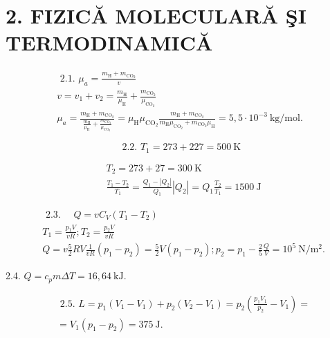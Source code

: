 \documentclass[10pt]{article}
\begin{document}
\section*{2. FIZICĂ MOLECULARĂ ŞI TERMODINAMICĂ}
$$
\begin{gathered}
\text { 2.1. } \mu_{a}=\frac{m_{\mathrm{H}}+m_{\mathrm{CO}_{2}}}{v} \\
v=v_{1}+v_{2}=\frac{m_{\mathrm{H}}}{\mu_{\mathrm{H}}}+\frac{m_{\mathrm{CO}_{2}}}{\mu_{\mathrm{CO}_{2}}} \\
\mu_{a}=\frac{m_{\mathrm{H}}+m_{\mathrm{CO}_{2}}}{\frac{m_{\mathrm{H}}}{\mu_{\mathrm{H}}}+\frac{m_{\mathrm{CO}_{2}}}{\mu_{\mathrm{CO}_{2}}}}=\mu_{\mathrm{H}} \mu_{\mathrm{CO}_{2}} \frac{m_{\mathrm{H}}+m_{\mathrm{CO}_{2}}}{m_{\mathrm{H}} \mu_{\mathrm{CO}_{2}}+m_{\mathrm{CO}_{2}} \mu_{\mathrm{H}}}=5,5 \cdot 10^{-3} \mathrm{~kg} / \mathrm{mol} .
\end{gathered}
$$

$$
\text { 2.2. } T_{1}=273+227=500 \mathrm{~K}
$$

$$
\begin{aligned}
& T_{2}=273+27=300 \mathrm{~K} \\
& \frac{T_{1}-T_{2}}{T_{1}}=\frac{Q_{1}-\left|Q_{2}\right|}{Q_{1}}\left|Q_{2}\right|=Q_{1} \frac{T_{2}}{T_{1}}=1500 \mathrm{~J}
\end{aligned}
$$

$$
\begin{aligned}
& \text { 2.3. } \quad Q=v C_{V}\left(T_{1}-T_{2}\right) \\
& T_{1}=\frac{p_{1} V}{v R} ; T_{2}=\frac{p_{2} V}{v R} \\
& Q=v \frac{5}{2} R V \frac{1}{v R}\left(p_{1}-p_{2}\right)=\frac{5}{2} V\left(p_{1}-p_{2}\right) ; p_{2}=p_{1}-\frac{2}{5} \frac{Q}{V}=10^{5} \mathrm{~N} / \mathrm{m}^{2} .
\end{aligned}
$$

2.4. $Q=c_{p} m \Delta T=16,64 \mathrm{~kJ}$.

$$
\begin{aligned}
& \text { 2.5. } L=p_{1}\left(V_{1}-V_{1}\right)+p_{2}\left(V_{2}-V_{1}\right)=p_{2}\left(\frac{p_{1} V_{1}}{p_{2}}-V_{1}\right)= \\
& =V_{1}\left(p_{1}-p_{2}\right)=375 \mathrm{~J} \text {. }
\end{aligned}
$$
\end{document}
